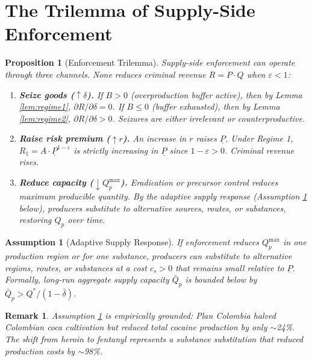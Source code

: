 \documentclass[12pt, a4paper]{article}
\newtheorem{assumption}{Assumption}
\newtheorem{proposition}{Proposition}
\newtheorem{remark}{Remark}
\begin{document}
\section{The Trilemma of Supply-Side Enforcement}

\begin{proposition}[Enforcement Trilemma]
\label{prop:trilemma}
Supply-side enforcement can operate through three channels. None reduces criminal revenue $R = P \cdot Q$ when $\varepsilon < 1$:

\begin{enumerate}[label=\textbf{Channel \arabic*:}, leftmargin=3.5cm]
    \item \textbf{Seize goods ($\uparrow \delta$).} If $B > 0$ (overproduction buffer active), then by Lemma \ref{lem:regime1}, $\partial R/\partial \delta = 0$. If $B \leq 0$ (buffer exhausted), then by Lemma \ref{lem:regime2}, $\partial R/\partial \delta > 0$. Seizures are either irrelevant or counterproductive.
    
    \item \textbf{Raise risk premium ($\uparrow r$).} An increase in $r$ raises $\underline{P}$. Under Regime 1, $R_1 = A \cdot \underline{P}^{1-\varepsilon}$ is strictly increasing in $\underline{P}$ since $1 - \varepsilon > 0$. Criminal revenue rises.
    
    \item \textbf{Reduce capacity ($\downarrow Q_p^{\max}$).} Eradication or precursor control reduces maximum producible quantity. By the adaptive supply response (Assumption \ref{ass:adaptive} below), producers substitute to alternative sources, routes, or substances, restoring $Q_p$ over time.
\end{enumerate}
\end{proposition}

\begin{assumption}[Adaptive Supply Response]
\label{ass:adaptive}
If enforcement reduces $Q_p^{\max}$ in one production region or for one substance, producers can substitute to alternative regions, routes, or substances at a cost $c_s > 0$ that remains small relative to $\underline{P}$. Formally, long-run aggregate supply capacity $\bar{Q}_p$ is bounded below by $\bar{Q}_p > Q^*/(1-\bar{\delta})$.
\end{assumption}

\begin{remark}
Assumption \ref{ass:adaptive} is empirically grounded: Plan Colombia halved Colombian coca cultivation but reduced total cocaine production by only $\sim$24\%. The shift from heroin to fentanyl represents a substance substitution that reduced production costs by $\sim$98\%.
\end{remark}
\end{document}
